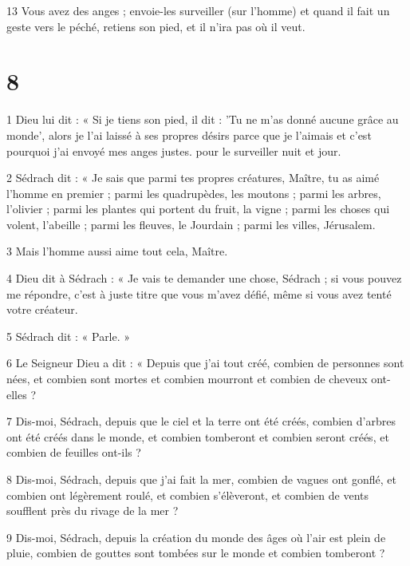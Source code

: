 \par 13 Vous avez des anges ; envoie-les surveiller (sur l'homme) et quand il fait un geste vers le péché, retiens son pied, et il n’ira pas où il veut.

\chapter{8}

\par 1 Dieu lui dit : « Si je tiens son pied, il dit : 'Tu ne m'as donné aucune grâce au monde', alors je l'ai laissé à ses propres désirs parce que je l'aimais et c'est pourquoi j'ai envoyé mes anges justes. pour le surveiller nuit et jour.

\par 2 Sédrach dit : « Je sais que parmi tes propres créatures, Maître, tu as aimé l'homme en premier ; parmi les quadrupèdes, les moutons ; parmi les arbres, l'olivier ; parmi les plantes qui portent du fruit, la vigne ; parmi les choses qui volent, l'abeille ; parmi les fleuves, le Jourdain ; parmi les villes, Jérusalem.

\par 3 Mais l’homme aussi aime tout cela, Maître.

\par 4 Dieu dit à Sédrach : « Je vais te demander une chose, Sédrach ; si vous pouvez me répondre, c’est à juste titre que vous m’avez défié, même si vous avez tenté votre créateur.

\par 5 Sédrach dit : « Parle. »

\par 6 Le Seigneur Dieu a dit : « Depuis que j'ai tout créé, combien de personnes sont nées, et combien sont mortes et combien mourront et combien de cheveux ont-elles ?

\par 7 Dis-moi, Sédrach, depuis que le ciel et la terre ont été créés, combien d'arbres ont été créés dans le monde, et combien tomberont et combien seront créés, et combien de feuilles ont-ils ?

\par 8 Dis-moi, Sédrach, depuis que j'ai fait la mer, combien de vagues ont gonflé, et combien ont légèrement roulé, et combien s'élèveront, et combien de vents soufflent près du rivage de la mer ?

\par 9 Dis-moi, Sédrach, depuis la création du monde des âges où l'air est plein de pluie, combien de gouttes sont tombées sur le monde et combien tomberont ?

